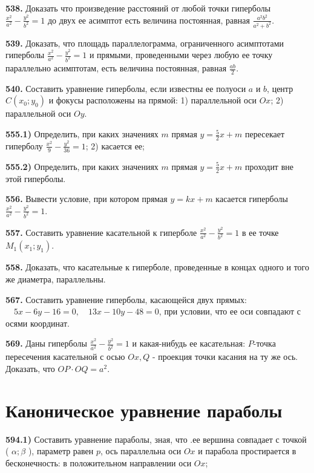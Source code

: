 \textbf{538.} Доказать что произведение расстояний от любой точки гиперболы $\frac{x^2}{a^2}-\frac{y^2}{b^2}=1$ до двух ее асимптот есть величина постоянная, равная $\frac{a^2 b^2}{a^2+b^2}$.

\textbf{539.} Доказать, что площадь параллелограмма, ограниченного асимптотами гиперболы $\frac{x^2}{a^2}-\frac{y^2}{b^2}=1$ и прямыми, проведенными через любую ее точку параллельно асимптотам, есть величина постоянная, равная $\frac{a b}{2}$.

\textbf{540.} Составить уравнение гиперболы, если известны ее полуоси $a$ и $b$, центр $C\left(x_0 ; y_0\right)$ и фокусы расположены на прямой: 1) параллельной оси $O x$; 2) параллельной оси $O y$.

\textbf{555.1)} Определить, при каких значениях $m$ прямая $y=\frac{5}{2} x+m$ пересекает гиперболу $\frac{x^2}{9}-\frac{y^2}{36}=1$; 2) касается ее;

\textbf{555.2)} Определить, при каких значениях $m$ прямая $y=\frac{5}{2} x+m$ проходит вне этой гиперболы.

\textbf{556.} Вывести условие, при котором прямая $y=k x+m$ касается гиперболы $\frac{x^2}{a^2}-\frac{y^2}{b^2}=1$.

\textbf{557.} Составить уравнение касательной к гиперболе $\frac{x^2}{a^2}-\frac{y^2}{b^2}=1$ в ее точке $M_1\left(x_1 ; y_1\right)$.

\textbf{558.} Доказать, что касательные к гиперболе, проведенные в концах одного и того же диаметра, параллельны.

\textbf{567.} Составить уравнение гиперболы, касающейся двух прямых: $\quad 5 x-6 y-16=0, \quad 13 x-10 y-48=0$, при условии, что ее оси совпадают с осями координат.

\textbf{569.} Даны гиперболы $\frac{x^2}{a^2}-\frac{y^2}{b^2}=1$ и какая-нибудь ее касательная: $P$-точка пересечения касательной с осью $O x, Q$ - проекция точки касания на ту же ось. Доказать, что $O P \cdot O Q=a^2$.



\section{Каноническое уравнение параболы}



\textbf{594.1)} Составить уравнение параболы, зная, что .ее вершина совпадает с точкой ( $\alpha ; \beta$ ), параметр равен $p$, ось параллельна оси $O x$ и парабола простирается в бесконечность: в положительном направлении оси $O x$;

